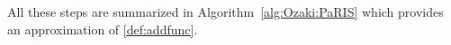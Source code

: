 \documentclass[12pt]{article}
\newcommand{\rmd}{\mathrm{d}}
\newcommand{\eqsp}{\;}
\newcommand{\1}{\mathrm{1}}
\begin{document}
All these steps are summarized in Algorithm~\ref{alg:Ozaki:PaRIS} which provides an approximation of \eqref{def:addfunc}. %
\end{document}
